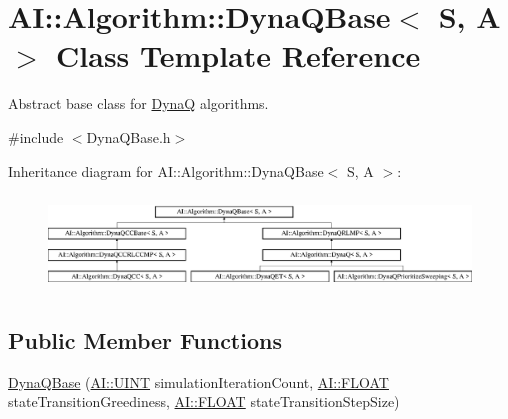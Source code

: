 \hypertarget{classAI_1_1Algorithm_1_1DynaQBase}{\section{A\+I\+:\+:Algorithm\+:\+:Dyna\+Q\+Base$<$ S, A $>$ Class Template Reference}
\label{classAI_1_1Algorithm_1_1DynaQBase}
}


Abstract base class for \hyperlink{classAI_1_1Algorithm_1_1DynaQ}{Dyna\+Q} algorithms.  




{\ttfamily \#include $<$Dyna\+Q\+Base.\+h$>$}

Inheritance diagram for A\+I\+:\+:Algorithm\+:\+:Dyna\+Q\+Base$<$ S, A $>$\+:\begin{figure}[H]
\begin{center}
\leavevmode
\includegraphics[height=2.557078cm]{classAI_1_1Algorithm_1_1DynaQBase}
\end{center}
\end{figure}
\subsection*{Public Member Functions}
\begin{DoxyCompactItemize}
\item 
\hyperlink{classAI_1_1Algorithm_1_1DynaQBase_a089f4024fab2f19179dea637b7f6c8ee}{Dyna\+Q\+Base} (\hyperlink{namespaceAI_ab6e14dc1e659854858a87e511f1439ec}{A\+I\+::\+U\+I\+N\+T} simulation\+Iteration\+Count, \hyperlink{namespaceAI_a41b74884a20833db653dded3918e05c3}{A\+I\+::\+F\+L\+O\+A\+T} state\+Transition\+Greediness, \hyperlink{namespaceAI_a41b74884a20833db653dded3918e05c3}{A\+I\+::\+F\+L\+O\+A\+T} state\+Transition\+Step\+Size)
\end{DoxyCompactItemize}
